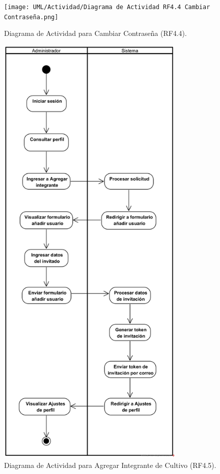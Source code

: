 \begin{figure}[H]
	\centering
		\caption{Diagrama de Actividad para Cambiar Contraseña (RF4.4).}
	\texttt{[image: UML/Actividad/Diagrama de Actividad RF4.4 Cambiar Contraseña.png]}
\end{figure}


\begin{figure}[H]
	\centering
	\caption{Diagrama de Actividad para Agregar Integrante de Cultivo (RF4.5).}
 \includegraphics[width=0.8\textwidth]{UML/Actividad/Diagrama de Actividad RF4.5 Agregar Integrante Cultivo.png}
\end{figure}


